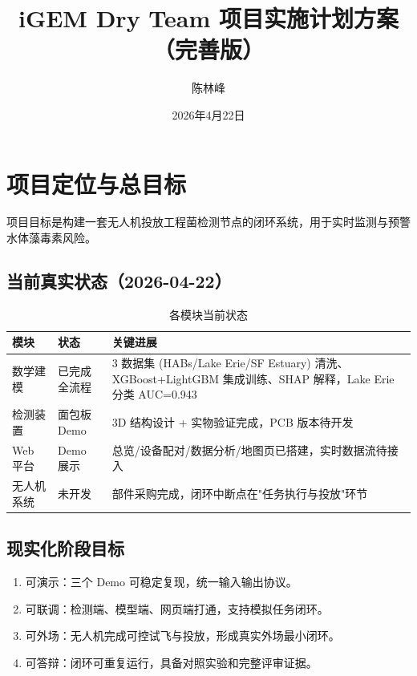 \documentclass[12pt,a4paper,openany]{ctexrep}
\title{\textbf{iGEM Dry Team 项目实施计划方案} \\ \large （完善版）}
\author{陈林峰}
\date{2026年4月22日}
\begin{document}
\maketitle
\tableofcontents
\newpage

\chapter{项目定位与总目标}

项目目标是构建一套无人机投放工程菌检测节点的闭环系统，用于实时监测与预警水体藻毒素风险。

\section{当前真实状态（2026-04-22）}

\begin{table}[htbp]
\centering
\caption{各模块当前状态}
\begin{tabularx}{\textwidth}{l l X}
\toprule
\textbf{模块} & \textbf{状态} & \textbf{关键进展} \\
\midrule
数学建模 & 已完成全流程 & 3 数据集 (HABs/Lake Erie/SF Estuary) 清洗、XGBoost+LightGBM 集成训练、SHAP 解释，Lake Erie 分类 AUC=0.943 \\
检测装置 & 面包板 Demo & 3D 结构设计 + 实物验证完成，PCB 版本待开发 \\
Web 平台 & Demo 展示 & 总览/设备配对/数据分析/地图页已搭建，实时数据流待接入 \\
无人机系统 & 未开发 & 部件采购完成，闭环中断点在"任务执行与投放"环节 \\
\bottomrule
\end{tabularx}
\end{table}

\section{现实化阶段目标}

\begin{enumerate}[label=M\arabic*（)]
\item 可演示：三个 Demo 可稳定复现，统一输入输出协议。
\item 可联调：检测端、模型端、网页端打通，支持模拟任务闭环。
\item 可外场：无人机完成可控试飞与投放，形成真实外场最小闭环。
\item 可答辩：闭环可重复运行，具备对照实验和完整评审证据。
\end{enumerate}
\end{document}
